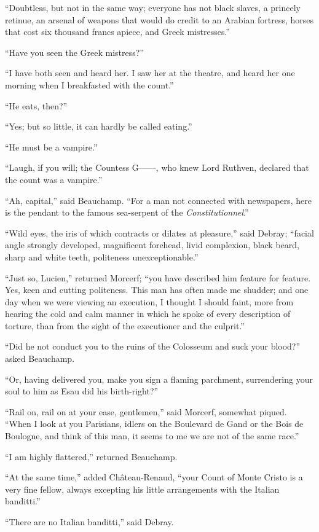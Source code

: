 “Doubtless, but not in the same way; everyone has not black slaves, a
princely retinue, an arsenal of weapons that would do credit to an
Arabian fortress, horses that cost six thousand francs apiece, and
Greek mistresses.”

“Have you seen the Greek mistress?”

“I have both seen and heard her. I saw her at the theatre, and heard
her one morning when I breakfasted with the count.”

“He eats, then?”

“Yes; but so little, it can hardly be called eating.”

“He must be a vampire.”

“Laugh, if you will; the Countess G——, who knew Lord Ruthven, declared
that the count was a vampire.”

“Ah, capital,” said Beauchamp. “For a man not connected with
newspapers, here is the pendant to the famous sea-serpent of the
\textit{Constitutionnel}.”

“Wild eyes, the iris of which contracts or dilates at pleasure,” said
Debray; “facial angle strongly developed, magnificent forehead, livid
complexion, black beard, sharp and white teeth, politeness
unexceptionable.”

“Just so, Lucien,” returned Morcerf; “you have described him feature
for feature. Yes, keen and cutting politeness. This man has often made
me shudder; and one day when we were viewing an execution, I thought I
should faint, more from hearing the cold and calm manner in which he
spoke of every description of torture, than from the sight of the
executioner and the culprit.”

“Did he not conduct you to the ruins of the Colosseum and suck your
blood?” asked Beauchamp.

“Or, having delivered you, make you sign a flaming parchment,
surrendering your soul to him as Esau did his birth-right?”

“Rail on, rail on at your ease, gentlemen,” said Morcerf, somewhat
piqued. “When I look at you Parisians, idlers on the Boulevard de Gand
or the Bois de Boulogne, and think of this man, it seems to me we are
not of the same race.”

“I am highly flattered,” returned Beauchamp.

“At the same time,” added Château-Renaud, “your Count of Monte Cristo
is a very fine fellow, always excepting his little arrangements with
the Italian banditti.”

“There are no Italian banditti,” said Debray.

